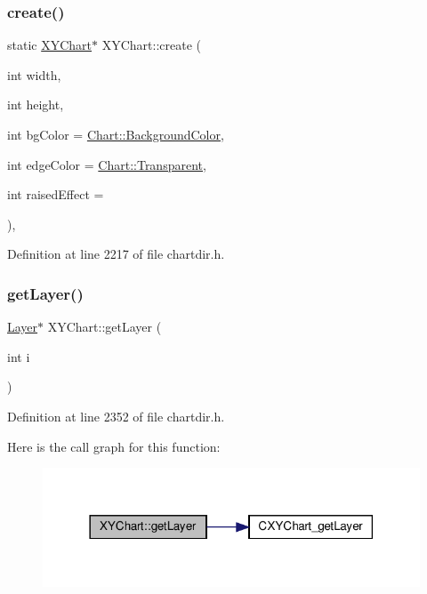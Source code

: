\subsubsection{\texorpdfstring{create()}{create()}}
{\footnotesize\ttfamily static \hyperlink{class_x_y_chart}{X\+Y\+Chart}$\ast$ X\+Y\+Chart\+::create (\begin{DoxyParamCaption}\item[{int}]{width,  }\item[{int}]{height,  }\item[{int}]{bg\+Color = {\ttfamily \hyperlink{namespace_chart_abee0d882fdc9ad0b001245ad9fc64011a134193bde693b9d152d0c6dc59fa7d7f}{Chart\+::\+Background\+Color}},  }\item[{int}]{edge\+Color = {\ttfamily \hyperlink{namespace_chart_abee0d882fdc9ad0b001245ad9fc64011afc6811800a9e2582dac0157b6279f836}{Chart\+::\+Transparent}},  }\item[{int}]{raised\+Effect = {} }\end{DoxyParamCaption})\hspace{0.3cm}{\ttfamily [inline]}, {\ttfamily [static]}}



Definition at line 2217 of file chartdir.\+h.

\mbox{\label{class_x_y_chart_a2a4212951b62b1e2e1b64f1c7545187e}} 
\subsubsection{\texorpdfstring{get\+Layer()}{getLayer()}}
{\footnotesize\ttfamily \hyperlink{class_layer}{Layer}$\ast$ X\+Y\+Chart\+::get\+Layer (\begin{DoxyParamCaption}\item[{int}]{i }\end{DoxyParamCaption})\hspace{0.3cm}{\ttfamily [inline]}}



Definition at line 2352 of file chartdir.\+h.

Here is the call graph for this function\+:
\nopagebreak
\begin{figure}[H]
\begin{center}
\leavevmode
\includegraphics[width=318pt]{class_x_y_chart_a2a4212951b62b1e2e1b64f1c7545187e_cgraph}
\end{center}
\end{figure}
\mbox{\label{class_x_y_chart_a4de65c0474c84c4986a3d1f48cf98abe}} 
